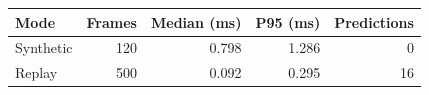 \begin{tabular}{lrrrr}
\toprule
Mode & Frames & Median (ms) & P95 (ms) & Predictions \\
\midrule
Synthetic & 120 & 0.798 & 1.286 & 0 \\
Replay & 500 & 0.092 & 0.295 & 16 \\
\bottomrule
\end{tabular}
